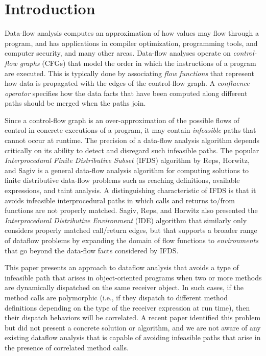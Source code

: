 \section{Introduction}

Data-flow analysis computes an approximation of how values may flow  
through a program, and has applications in compiler optimization, 
programming tools, and computer security, and many other areas.
Data-flow analyses operate on \textit{control-flow graphs} (CFGs)
that model 
the order in which the instructions of a program are executed. This is
typically done by associating \textit{flow functions} that represent how 
data is propagated with the edges of the control-flow graph.  A 
\textit{confluence operator} specifies how the data facts that have been 
computed along different paths should be merged when the paths join.

Since a control-flow graph is an over-approximation of the possible flows 
of control in concrete executions of a program, it may contain \textit{infeasible} 
paths that cannot occur at runtime. The precision of a data-flow analysis algorithm
depends critically on its ability to detect and disregard such infeasible paths.
The popular \textit{Interprocedural Finite Distributive Subset} (IFDS) algorithm 
by  Reps, Horwitz, and Sagiv \cite{reps1995precise} is a general data-flow analysis
algorithm for computing solutions to finite distributive data-flow problems such 
as reaching definitions, available expressions, and taint analysis. A distinguishing 
characteristic of IFDS is that it avoids infeasible interprocedural paths in which calls 
and returns to/from functions are not properly matched. Sagiv, Reps, and Horwitz
also presented the \textit{Interprocedural Distributive Environment} (IDE) algorithm
\cite{sagiv1996precise} that similarly only considers properly matched call/return
edges, but that supports a broader range of dataflow problems by expanding the 
domain of flow functions to \textit{environments} that go beyond the data-flow facts 
considered by IFDS.

This paper presents an approach to dataflow analysis that avoids a type
of infeasible path that arises in object-oriented programs when two or more
methods are dynamically dispatched on the same receiver object. In such cases, if the
method calls are polymorphic (i.e., if they dispatch to different method definitions 
depending on the type of the receiver expression at run time), then their dispatch 
behaviors will be correlated. A recent paper \cite{DBLP:journals/scp/Tip15} identified
this problem but did not present a concrete solution or algorithm, and we are not aware 
of any existing dataflow analysis that is capable of avoiding infeasible paths that arise 
in the presence of correlated method calls.


